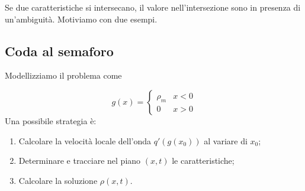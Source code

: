 \documentclass[10pt,a4paper,twoside,openright]{book}
\begin{document}
Se due caratteristiche si intersecano, il valore nell'intersezione sono in presenza di un'ambiguità. Motiviamo con due esempi.
\subsection{Coda al semaforo}

Modellizziamo il problema come


\begin{equation*}
	g( x) =
	\begin{cases}
		\rho _{m} & x< 0 \\
		0         & x >0 
	\end{cases}
\end{equation*}
Una possibile strategia è:
\begin{enumerate}
	\item Calcolare la velocità locale dell'onda $q'( g( x_{0}))$ al variare di $x_{0}$;
	\item Determinare e tracciare nel piano $( x,t)$ le caratteristiche;
	\item Calcolare la soluzione $\rho ( x,t)$.
\end{enumerate}
\end{document}
